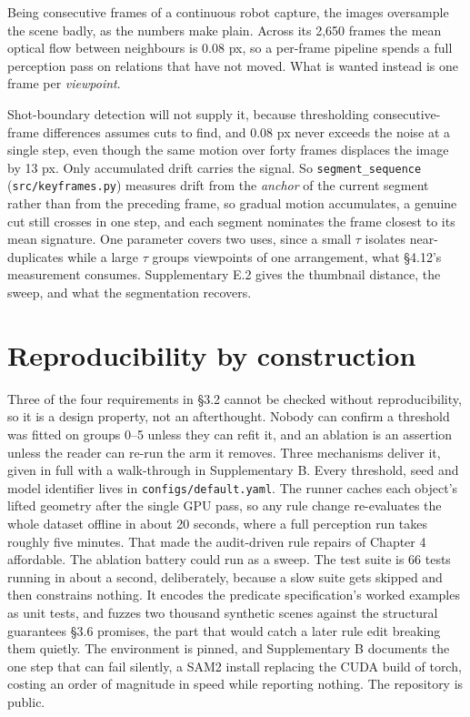 Being consecutive frames of a continuous robot capture, the images oversample the scene badly, as the numbers make plain. Across its 2,650 frames the mean optical flow between neighbours is 0.08 px, so a per-frame pipeline spends a full perception pass on relations that have not moved. What is wanted instead is one frame per \textit{viewpoint}.

Shot-boundary detection will not supply it, because thresholding consecutive-frame differences assumes cuts to find, and 0.08 px never exceeds the noise at a single step, even though the same motion over forty frames displaces the image by 13 px. Only accumulated drift carries the signal. So \texttt{segment\_\allowbreak{}sequence} (\texttt{src/keyframes.py}) measures drift from the \textit{anchor} of the current segment rather than from the preceding frame, so gradual motion accumulates, a genuine cut still crosses in one step, and each segment nominates the frame closest to its mean signature. One parameter covers two uses, since a small $\tau$ isolates near-duplicates while a large $\tau$ groups viewpoints of one arrangement, what \S{}4.12's measurement consumes. Supplementary E.2 gives the thumbnail distance, the sweep, and what the segmentation recovers.

\section{Reproducibility by construction}

Three of the four requirements in \S{}3.2 cannot be checked without reproducibility, so it is a design property, not an afterthought. Nobody can confirm a threshold was fitted on groups 0--5 unless they can refit it, and an ablation is an assertion unless the reader can re-run the arm it removes. Three mechanisms deliver it, given in full with a walk-through in Supplementary B. Every threshold, seed and model identifier lives in \texttt{configs/default.yaml}. The runner caches each object's lifted geometry after the single GPU pass, so any rule change re-evaluates the whole dataset offline in about 20 seconds, where a full perception run takes roughly five minutes. That made the audit-driven rule repairs of Chapter 4 affordable. The ablation battery could run as a sweep. The test suite is 66 tests running in about a second, deliberately, because a slow suite gets skipped and then constrains nothing. It encodes the predicate specification's worked examples as unit tests, and fuzzes two thousand synthetic scenes against the structural guarantees \S{}3.6 promises, the part that would catch a later rule edit breaking them quietly. The environment is pinned, and Supplementary B documents the one step that can fail silently, a SAM2 install replacing the CUDA build of torch, costing an order of magnitude in speed while reporting nothing. The repository is public.

